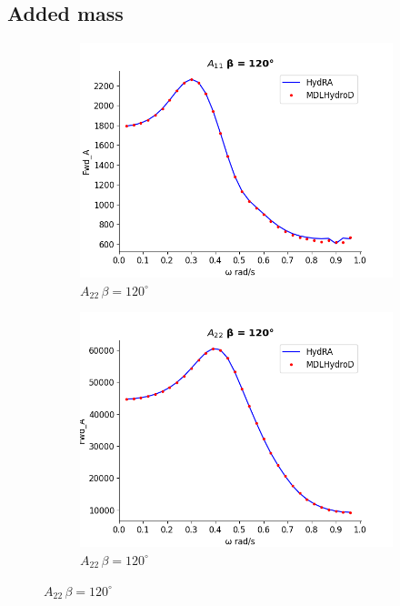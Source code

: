 \subsection{Added mass}
\begin{figure}[H]
    \centering
    \begin{subfigure}[b]{0.49\textwidth}
        \includegraphics[width=\textwidth]{plots/kcs/added_mass/a11.png}
        \caption{$A_{22} \, \beta = 120^{\circ}$}
    \end{subfigure}
    \begin{subfigure}[b]{0.49\textwidth}
        \includegraphics[width=\textwidth]{plots/kcs/added_mass/a22.png}
        \caption{$A_{22} \, \beta = 120^{\circ}$}
    \end{subfigure}

\end{figure}
